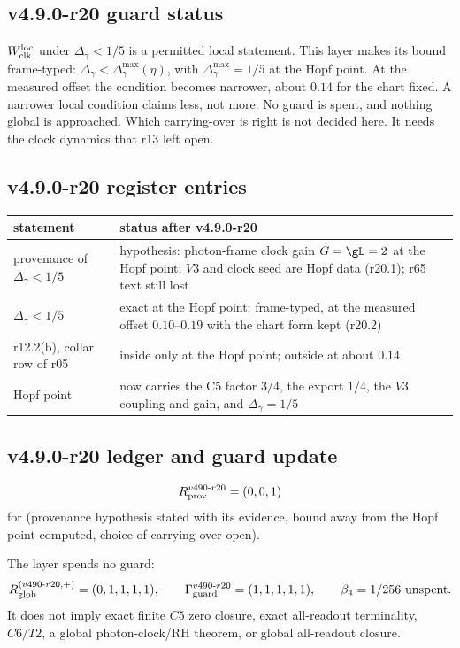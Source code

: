 \subsection*{v4.9.0-r20 guard status}
\label{subsec:v490-r20-guard}

\(W_{\rm clk}^{\rm loc}\) under \(\Delta_\gamma<1/5\) is a permitted local statement.  This layer makes its bound frame-typed:
\(\Delta_\gamma<\Delta_\gamma^{\max}(\eta)\), with \(\Delta_\gamma^{\max}=1/5\) at the Hopf point.  At the measured offset the
condition becomes narrower, about \(0.14\) for the chart fixed.  A narrower local condition claims less, not more.  No guard is
spent, and nothing global is approached.  Which carrying-over is right is not decided here.  It needs the clock dynamics that
r13 left open.

\subsection*{v4.9.0-r20 register entries}
\label{subsec:v490-r20-register}

\begin{center}
\small
\begin{tabular}{@{}>{\raggedright\arraybackslash}p{}>{\raggedright\arraybackslash}p{}@{}}
\toprule
statement & status after v4.9.0-r20\\
\midrule
provenance of \(\Delta_\gamma<1/5\) & hypothesis: photon-frame clock gain \(G=\gL=2\) at the Hopf point; \(V3\) and clock seed are Hopf data (r20.1); r65 text still lost\\
\(\Delta_\gamma<1/5\) & exact at the Hopf point; frame-typed, at the measured offset \(0.10\)--\(0.19\) with the chart form kept (r20.2)\\
r12.2(b), collar row of r05 & inside only at the Hopf point; outside at about \(0.14\)\\
Hopf point & now carries the C5 factor \(3/4\), the export \(1/4\), the \(V3\) coupling and gain, and \(\Delta_\gamma=1/5\)\\
\bottomrule
\end{tabular}
\end{center}

\subsection*{v4.9.0-r20 ledger and guard update}
\label{subsec:v490-r20-ledger-guard}

\[
R_{\rm prov}^{v490\text{-}r20}=(0,0,1)
\]
for (provenance hypothesis stated with its evidence, bound away from the Hopf point computed, choice of carrying-over open).

The layer spends no guard:
\[
R_{\rm glob}^{(v490\text{-}r20,+)}=(0,1,1,1,1),
\qquad
\Gamma_{\rm guard}^{v490\text{-}r20}=(1,1,1,1,1),
\qquad
\beta_4=1/256\ \text{unspent}.
\]
It does not imply exact finite \(C5\) zero closure, exact all-readout terminality,
\(C6/T2\), a global photon-clock/RH theorem, or global all-readout closure.

